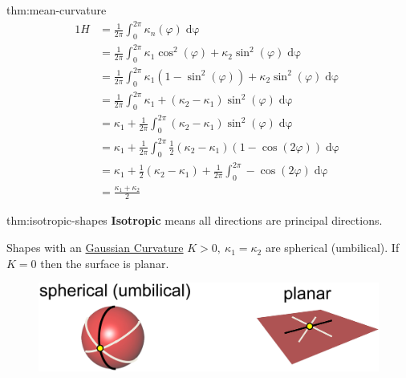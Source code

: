 \documentclass{article}
\begin{document}
\begin{prf}{thm:mean-curvature}
    \begin{alignat*}{1}
        H &= \frac{1}{2\pi} \int_{0}^{2\pi} \kappa_{n}(\varphi) \operatorname{d\varphi}\\
          &= \frac{1}{2\pi} \int_{0}^{2\pi} \kappa_{1}\cos^2(\varphi) + \kappa_{2} \sin^2 (\varphi) \operatorname{d\varphi}\\
          &= \frac{1}{2\pi} \int_{0}^{2\pi} \kappa_{1}(1-\sin^2(\varphi)) + \kappa_{2} \sin^2 (\varphi) \operatorname{d\varphi}\\
          &= \frac{1}{2\pi} \int_{0}^{2\pi} \kappa_{1} + (\kappa_{2}-\kappa_{1}) \sin^2 (\varphi) \operatorname{d\varphi}\\
          &= \kappa_{1} + \frac{1}{2\pi} \int_{0}^{2\pi} (\kappa_{2}-\kappa_{1}) \sin^2 (\varphi) \operatorname{d\varphi}\\
          &= \kappa_{1} + \frac{1}{2\pi} \int_{0}^{2\pi} \frac{1}{2}(\kappa_{2}-\kappa_{1}) (1- \cos(2\varphi)) \operatorname{d\varphi}\\
          &= \kappa_{1} + \frac{1}{2}(\kappa_{2}-\kappa_{1}) + \frac{1}{2\pi} \int_{0}^{2\pi} - \cos(2\varphi) \operatorname{d\varphi}\\
          & = \frac{\kappa_{1} + \kappa_{2}}{2}
    \end{alignat*}
    
\end{prf}


\newpage

\begin{defin}{thm:isotropic-shapes}
    \textbf{Isotropic} means all directions are principal directions.

    \vspace{5px}

    Shapes with an \hyperref[thm:surface-curvatures]{Gaussian Curvature} \(K > 0, \ \kappa_{1} = \kappa_{2}\)
    are spherical (umbilical). If \(K = 0\) then the surface is planar.
\end{defin}

\begin{figure}[!ht]
    \centering
    \includegraphics[width=0.5\linewidth]{images/Isotropic_Shapes.png}
\end{figure}
\end{document}
